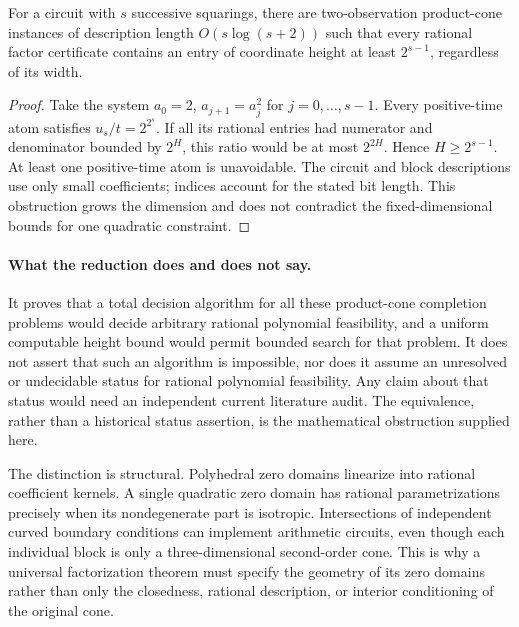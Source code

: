 \begin{corollary}
For a circuit with $s$ successive squarings, there are two-observation product-cone instances of description length $O(s\log(s+2))$ such that every rational factor certificate contains an entry of coordinate height at least $2^{s-1}$, regardless of its width.
\end{corollary}
\begin{proof}
Take the system $a_0=2$, $a_{j+1}=a_j^2$ for $j=0,\ldots,s-1$. Every positive-time atom satisfies $u_s/t=2^{2^s}$. If all its rational entries had numerator and denominator bounded by $2^H$, this ratio would be at most $2^{2H}$. Hence $H\geq2^{s-1}$. At least one positive-time atom is unavoidable. The circuit and block descriptions use only small coefficients; indices account for the stated bit length. This obstruction grows the dimension and does not contradict the fixed-dimensional bounds for one quadratic constraint.
\end{proof}

\paragraph{What the reduction does and does not say.}
It proves that a total decision algorithm for all these product-cone completion problems would decide arbitrary rational polynomial feasibility, and a uniform computable height bound would permit bounded search for that problem. It does not assert that such an algorithm is impossible, nor does it assume an unresolved or undecidable status for rational polynomial feasibility. Any claim about that status would need an independent current literature audit. The equivalence, rather than a historical status assertion, is the mathematical obstruction supplied here.

The distinction is structural. Polyhedral zero domains linearize into rational coefficient kernels. A single quadratic zero domain has rational parametrizations precisely when its nondegenerate part is isotropic. Intersections of independent curved boundary conditions can implement arithmetic circuits, even though each individual block is only a three-dimensional second-order cone. This is why a universal factorization theorem must specify the geometry of its zero domains rather than only the closedness, rational description, or interior conditioning of the original cone.
